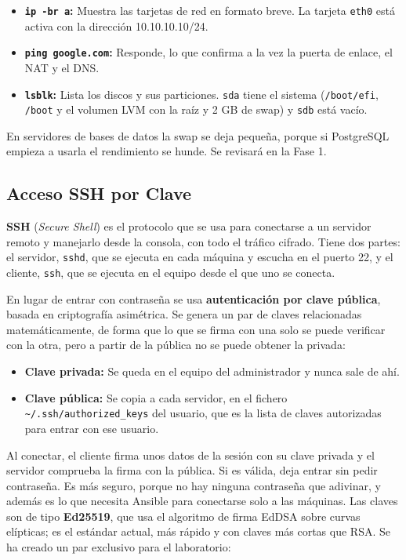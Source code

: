 \documentclass[11pt, a4paper, titlepage]{article}
\newcommand{\cod}[1]{\texttt{#1}}
\begin{document}
\begin{itemize}
    \item \textbf{\cod{ip -br a}:} Muestra las tarjetas de red en formato breve. La tarjeta \cod{eth0} está activa con la dirección 10.10.10.10/24.
    \item \textbf{\cod{ping google.com}:} Responde, lo que confirma a la vez la puerta de enlace, el NAT y el DNS.
    \item \textbf{\cod{lsblk}:} Lista los discos y sus particiones. \cod{sda} tiene el sistema (\cod{/boot/efi}, \cod{/boot} y el volumen LVM con la raíz y 2 GB de swap) y \cod{sdb} está vacío.
\end{itemize}

En servidores de bases de datos la swap se deja pequeña, porque si PostgreSQL empieza a usarla el rendimiento se hunde. Se revisará en la Fase 1.

\subsection{Acceso SSH por Clave}
\label{sec:ssh}

\textbf{SSH} (\textit{Secure Shell}) es el protocolo que se usa para conectarse a un servidor remoto y manejarlo desde la consola, con todo el tráfico cifrado. Tiene dos partes: el servidor, \cod{sshd}, que se ejecuta en cada máquina y escucha en el puerto 22, y el cliente, \cod{ssh}, que se ejecuta en el equipo desde el que uno se conecta.

En lugar de entrar con contraseña se usa \textbf{autenticación por clave pública}, basada en criptografía asimétrica. Se genera un par de claves relacionadas matemáticamente, de forma que lo que se firma con una solo se puede verificar con la otra, pero a partir de la pública no se puede obtener la privada:

\begin{itemize}
    \item \textbf{Clave privada:} Se queda en el equipo del administrador y nunca sale de ahí.
    \item \textbf{Clave pública:} Se copia a cada servidor, en el fichero \cod{\textasciitilde/.ssh/authorized\_keys} del usuario, que es la lista de claves autorizadas para entrar con ese usuario.
\end{itemize}

Al conectar, el cliente firma unos datos de la sesión con su clave privada y el servidor comprueba la firma con la pública. Si es válida, deja entrar sin pedir contraseña. Es más seguro, porque no hay ninguna contraseña que adivinar, y además es lo que necesita Ansible para conectarse solo a las máquinas. Las claves son de tipo \textbf{Ed25519}, que usa el algoritmo de firma EdDSA sobre curvas elípticas; es el estándar actual, más rápido y con claves más cortas que RSA. Se ha creado un par exclusivo para el laboratorio:
\end{document}
